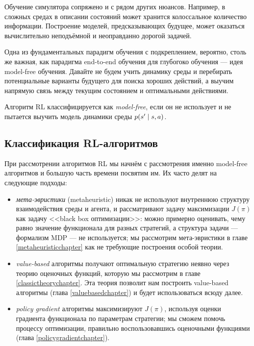Обучение симулятора сопряжено и с рядом других нюансов. Например, в сложных средах в описании состояний может хранится колоссальное количество информации. Построение моделей, предсказывающих будущее, может оказаться вычислительно неподъёмной и неоправданно дорогой задачей. 

Одна из фундаментальных парадигм обучения с подкреплением, вероятно, столь же важная, как парадигма end-to-end обучения для глубогоко обучения --- идея model-free обучения. Давайте не будем учить динамику среды и перебирать потенциальные варианты будущего для поиска хороших действий, а выучим напрямую связь между текущим состоянием и оптимальными действиями.

\begin{definition}
Алгоритм RL классифицируется как \emph{model-free}, если он не использует и не пытается выучить модель динамики среды $p(s' \HM\mid s, a)$. 
\end{definition}

\subsection{Классификация RL-алгоритмов}

При рассмотрении алгоритмов RL мы начнём с рассмотрения именно model-free алгоритмов и большую часть времени посвятим им. Их часто делят на следующие подходы:
\begin{itemize}
    \item \emph{мета-эвристики} (metaheuristic) никак не используют внутреннюю структуру взаимодействия среды и агента, и рассматривают задачу максимизации $J(\pi)$ как задачу <<black box оптимизации>>: можно примерно оценивать, чему равно значение функционала для разных стратегий, а структура задачи --- формализм MDP --- не используется; мы рассмотрим мета-эвристики в главе \ref{metaheuristicchapter} как не требующие построения особой теории. 
    \item \emph{value-based} алгоритмы получают оптимальную стратегию неявно через теорию оценочных функций, которую мы рассмотрим в главе \ref{classictheorychapter}. Эта теория позволит нам построить value-based алгоритмы (глава \ref{valuebasedchapter}) и будет использоваться всюду далее.
    \item \emph{policy gradient} алгоритмы максимизируют $J(\pi)$, используя оценки градиента функционала по параметрам стратегии; мы сможем помочь процессу оптимизации, правильно воспользовавшись оценочными функциями (глава \ref{policygradientchapter}).
\end{itemize}

